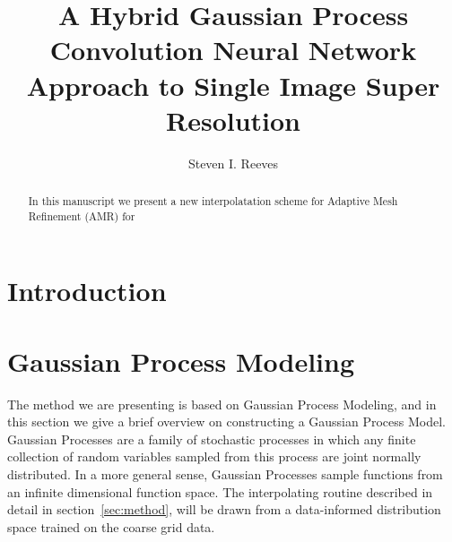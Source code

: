 \documentclass{article}%
\begin{document}

\title{A Hybrid Gaussian Process Convolution Neural Network Approach to Single Image Super Resolution}
\author{Steven I. Reeves}


\maketitle

\begin{abstract}
In this manuscript we present a new interpolatation scheme for Adaptive Mesh Refinement (AMR) for
\end{abstract}






\section{Introduction}
\label{sec:introduction}

\section{Gaussian Process Modeling}
\label{sec:GP}
The method we are presenting is based on Gaussian Process Modeling, and in this
section we give a brief overview on constructing a Gaussian Process Model. Gaussian Processes
are a family of stochastic processes in which any finite collection of random variables sampled
from this process are joint normally distributed. In a more general sense, Gaussian Processes sample functions
from an infinite dimensional function space. The interpolating routine described in detail in section~\ref{sec:method},
will be drawn from a data-informed distribution space trained on the coarse grid data.
\end{document}
